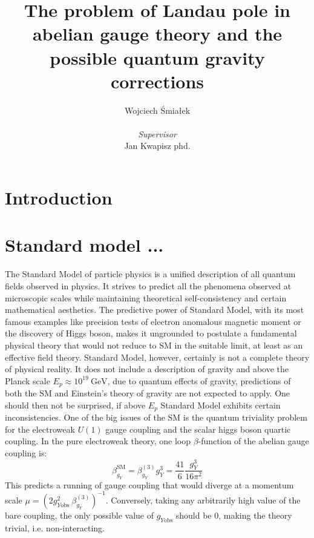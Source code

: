\documentclass[11pt, a4paper]{article}
\title{\vspace{-2cm}The problem of Landau pole in abelian gauge theory and the possible quantum gravity corrections}
\author{{Wojciech Śmiałek}\\
\\
{\textit{Supervisor}} \\
{Jan Kwapisz phd.}}
\date{}
\begin{document}
\maketitle

\section*{Introduction}

\section{Standard model ...}
The Standard Model of particle physics is a unified description of all quantum fields observed in physics. 
It strives to predict all the phenomena observed at microscopic scales while maintaining theoretical
self-consistency and certain mathematical aesthetics. The predictive power of Standard Model, with its most
famous examples like precision tests of electron anomalous magnetic moment or the discovery of Higgs boson,
makes it ungrounded to postulate a fundamental physical theory that would not reduce to SM in the suitable limit, at least
as an effective field theory.
Standard Model, however, certainly is not a complete theory of physical reality. It does not include a description
of gravity and above the Planck scale $E_p \approx 10^{19} \ \text{GeV}$, due to quantum effects of gravity,
predictions of both the SM and Einstein's theory of gravity are not expected to apply.
One should then not be surprised, if above $E_p$ Standard Model exhibits certain inconsistencies.
One of the big issues of the SM is the quantum triviality problem for the electroweak $U(1)$ gauge coupling and
the scalar higgs boson quartic coupling.
In the pure electroweak theory, one loop $\beta$-function of the abelian gauge coupling is: \cite{higgs mass}
\begin{equation}
    \beta_{g_Y}^{\text{SM}} = \beta_{g_Y}^{(3)} g_Y^3 = \frac{41}{6} \frac{g_Y^3}{16 \pi^2}
\end{equation}
This predicts a running of gauge coupling that would diverge at a momentum scale $\mu = \left(2 g_{Y\text{obs}}^2 \ \beta_{g_Y}^{(3)} \right)^{-1} $.
Conversely, taking any arbitrarily high value of the bare coupling, the only possible value of $g_{Y\text{obs}}$ should be 0, making
the theory trivial, i.e. non-interacting.
\end{document}
